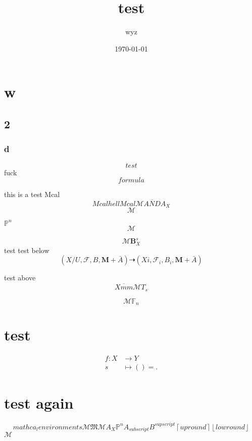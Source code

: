 \documentclass{article}
\title{test}
\author{wyz}
\date{\today}
\begin{document}
\maketitle
\section{w}
\subsection{2}

\subsubsection{d}
\begin{equation}
  test 
\end{equation}
fuck
\[
	formula
\]

\newpage

this is a test
Mcal
\begin{equation}
	Mcal hell Mcal
	\mathcal{M}  \overline{AND} A_{X}
\end{equation}
\[
	\mathcal{M}
\]

$\mathbb{P}^{n}$
\[
  \mathcal{M}
\]

\[
	\mathcal{M} \mathbf{B}_{X}^{s}
\]
test
test below
\[
	(X/U,\mathcal{F},B,\mathbf{M}+ \bar{A})  \dashrightarrow (Xi,\mathcal{F}_{i},B_{i},\mathbf{M}+\bar{A})
\]

test above
\[
	\overline{Xmm}  \mathcal{M} T_{s}
\]

\[
	\mathcal{M} \mathbb{F}_{n}
\]

\section{test}
\begin{center}
	\begin{align*}
		f : X & \longrightarrow Y \\
		s     & \longmapsto () =
		.\end{align*}
\end{center}

\section{test again}
\[
  mathca_{l} environments  \mathcal{M} \mathfrak{M} \mathscr{M} A_{X} \mathbb{P}^{n} A_{subscript} B^{supscript} \left\lceil up round \right\rceil \left\lfloor low round \right\rfloor 
\] $\mathcal{M}$
\end{document}
